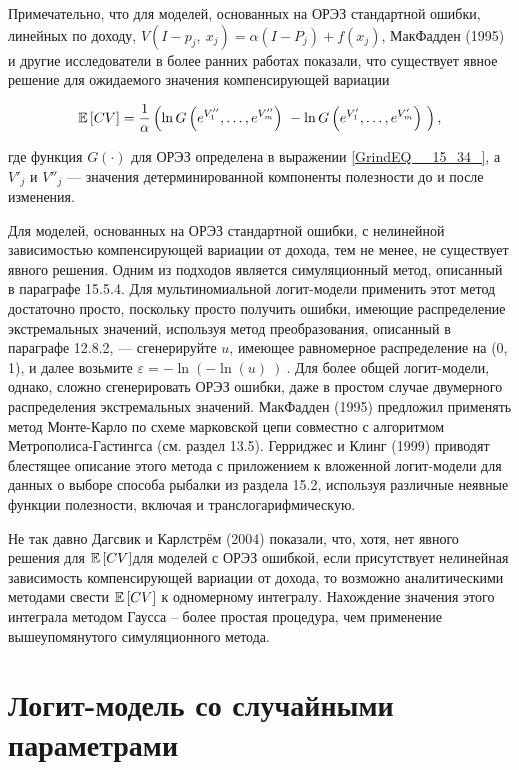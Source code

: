 Примечательно, что для моделей, основанных на ОРЭЗ стандартной ошибки, линейных по доходу, $V\left(I-p_j,\ x_j\right)=\alpha \left(I-P_j\right)+f(x_j)$, МакФадден (1995) и другие исследователи в более ранних работах показали, что существует явное решение для ожидаемого значения компенсирующей вариации

\[\E\left[CV\right]=\frac{1}{\alpha }\left({\ln  G\left(e^{V''_1},\dots ,e^{V''_m}\right)\ }-{\ln  G\left(e^{V'_1},\dots ,e^{V'_m}\right)\ }\right),\] 

где функция $G(\cdot )$ для ОРЭЗ определена в выражении \eqref{GrindEQ__15_34_}, а $V'_j$ и $V''_j$ --- значения детерминированной компоненты полезности до и после изменения.

Для моделей, основанных на  ОРЭЗ стандартной ошибки, с нелинейной зависимостью компенсирующей вариации от дохода, тем не менее, не существует явного решения. Одним из подходов является симуляционный метод, описанный в параграфе 15.5.4. Для мультиномиальной логит-модели применить этот метод достаточно просто, поскольку просто получить ошибки, имеющие распределение экстремальных значений, используя метод преобразования, описанный в параграфе 12.8.2, --- сгенерируйте $u$, имеющее равномерное распределение на (0, 1), и  далее возьмите $\varepsilon =-{\ln  (-{\ln  (u)\ })\ }$. Для более общей логит-модели, однако, сложно сгенерировать ОРЭЗ ошибки, даже в простом случае двумерного распределения экстремальных значений. МакФадден (1995) предложил применять метод Монте-Карло по схеме марковской цепи совместно с алгоритмом Метрополиса-Гастингса (см. раздел 13.5). Герриджес и Клинг (1999) приводят блестящее описание этого метода с приложением к вложенной логит-модели для данных о выборе способа рыбалки из раздела 15.2, используя различные неявные функции полезности, включая и транслогарифмическую.

Не так давно Дагсвик и Карлстрём (2004) показали, что, хотя, нет явного решения для $\mathbb{E}\left[CV\right]$для моделей с ОРЭЗ ошибкой, если присутствует нелинейная зависимость компенсирующей вариации от дохода, то возможно аналитическими методами свести $\mathbb{E}\left[CV\right]$ к одномерному интегралу. Нахождение значения этого интеграла методом Гаусса -- более простая процедура, чем применение вышеупомянутого симуляционного метода.

\section{Логит-модель со случайными параметрами}

